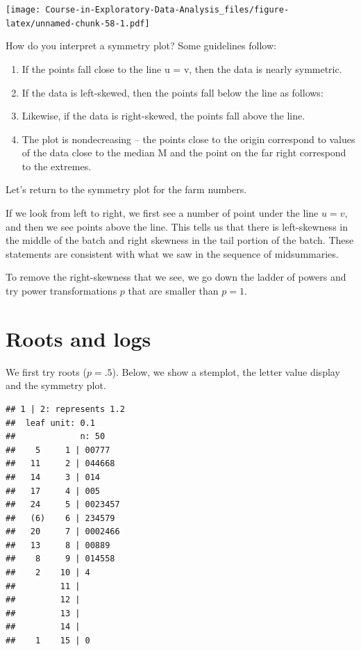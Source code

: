\documentclass[
]{book}
\newenvironment{Shaded}{\begin{snugshade}}{\end{snugshade}}
\newcommand{\FunctionTok}[1]{\textcolor[rgb]{0.00,0.00,0.00}{#1}}
\newcommand{\NormalTok}[1]{#1}
\newcommand{\OtherTok}[1]{\textcolor[rgb]{0.56,0.35,0.01}{#1}}
\newcommand{\SpecialCharTok}[1]{\textcolor[rgb]{0.00,0.00,0.00}{#1}}
\begin{document}
\texttt{[image: Course-in-Exploratory-Data-Analysis\_files/figure-latex/unnamed-chunk-58-1.pdf]}

How do you interpret a symmetry plot? Some guidelines follow:

\begin{enumerate}
\def\labelenumi{\arabic{enumi}.}
\item
  If the points fall close to the line u = v, then the data is nearly symmetric.
\item
  If the data is left-skewed, then the points fall below the line as follows:
\item
  Likewise, if the data is right-skewed, the points fall above the line.
\item
  The plot is nondecreasing -- the points close to the origin correspond to values of the data close to the median M and the point on the far right correspond to the extremes.
\end{enumerate}

Let's return to the symmetry plot for the farm numbers.

If we look from left to right, we first see a number of point under the line \(u = v\), and then we see points above the line. This tells us that there is left-skewness in the middle of the batch and right skewness in the tail portion of the batch. These statements are consistent with what we saw in the sequence of midsummaries.

To remove the right-skewness that we see, we go down the ladder of powers and try power transformations \(p\) that are smaller than \(p = 1\).

\hypertarget{roots-and-logs}{%
\section{Roots and logs}\label{roots-and-logs}}

We first try roots (\(p = .5\)). Below, we show a stemplot, the letter value display and the symmetry plot.

\begin{Shaded}
\end{Shaded}

\begin{verbatim}
## 1 | 2: represents 1.2
##  leaf unit: 0.1
##             n: 50
##    5     1 | 00777
##   11     2 | 044668
##   14     3 | 014
##   17     4 | 005
##   24     5 | 0023457
##   (6)    6 | 234579
##   20     7 | 0002466
##   13     8 | 00889
##    8     9 | 014558
##    2    10 | 4
##         11 | 
##         12 | 
##         13 | 
##         14 | 
##    1    15 | 0
\end{verbatim}
\end{document}
